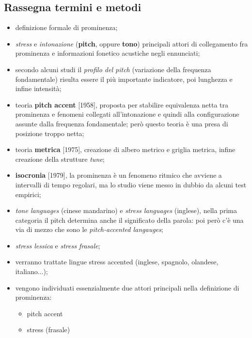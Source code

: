 \documentclass[twoside,twocolumn,11pt]{extarticle}
\theoremstyle{definition}
\begin{document}
	\subsection{Rassegna termini e metodi}
		\begin{itemize}
			\item definizione formale di prominenza;
			\item \textit{stress} e \textit{intonazione} (\textbf{pitch}, oppure \textbf{tono}) principali attori di collegamento fra prominenza e informazioni fonetico acustiche negli ennunciati;
			\item secondo alcuni studi il \textit{profilo del pitch} (variazione della frequenza fondamentale) risulta essere il più importante indicatore, poi lunghezza e infine intensità;
			\item teoria \textbf{pitch accent} [1958], proposta per stabilire equivalenza netta tra prominenza e fenomeni collegati all'intonazione e quindi alla configurazione assunte dalla frequenza fondamentale; però questo teoria è una presa di posizione troppo netta;
			\item teoria \textbf{metrica} [1975], creazione di albero metrico e griglia metrica, infine creazione della strutture \textit{tune};
			\item \textbf{isocronia} [1979], la prominenza è un fenomeno ritmico che avviene a intervalli di tempo regolari, ma lo studio viene messo in dubbio da alcuni test empirici;
			\item \textit{tone languages} (cinese mandarino) e \textit{stress languages} (inglese), nella prima categoria il pitch determina anche il significato della parola: poi però c'è una via di mezzo che sono le \textit{pitch-accented langauges};
			\item \textit{stress lessica} e \textit{stress frasale};
			\item verranno trattate lingue stress accented (inglese, spagnolo, olandese, italiano...);
			\item vengono individuati essenzialmente due attori principali nella definizione di prominenza:
			\begin{itemize}
				\item pitch accent
				\item stress (frasale)
			\end{itemize}
		\end{itemize}
	
\end{document}
